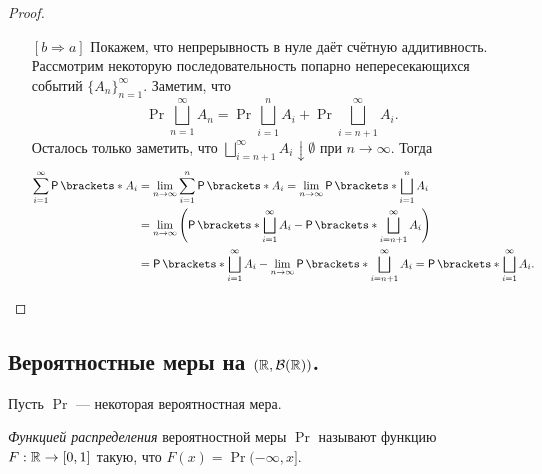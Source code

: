 \begin{proof}
\begin{itemize}
		\item[{\([b \Rightarrow a]\)}] Покажем, что непрерывность в нуле даёт счётную аддитивность. Рассмотрим некоторую последовательность попарно непересекающихся событий \(\{A_n\}_{n = 1}^{\infty}\). Заметим, что
		\[
		\Pr{\bigsqcup\limits_{n=1}^{\infty}A_n} =
		\Pr{\bigsqcup\limits_{i=1}^{n}A_i} +
		\Pr{\bigsqcup\limits_{i=n + 1}^{\infty} A_i}.
		\]
		Осталось только заметить, что \(\bigsqcup\limits_{i= n + 1}^{\infty} A_i \downarrow \emptyset\) при \(n \to \infty\). Тогда
		\begin{align}
			\sum\limits_{i = 1}^{\infty}\Pr{A_i} &=
			\lim\limits_{n\to\infty} \sum\limits_{i = 1}^{n}\Pr{A_i} =
			\lim\limits_{n\to\infty} \Pr{\bigsqcup\limits_{i = 1}^{n}A_i} \\
			&= \lim\limits_{n\to\infty} \left(
			\Pr{\bigsqcup\limits_{i = 1}^{\infty}A_i} -
			\Pr{\bigsqcup\limits_{i = n+1}^{\infty}A_i}
			\right) \\
			&= \Pr{\bigsqcup\limits_{i = 1}^{\infty}A_i} -
			\lim\limits_{n\to\infty} \Pr{\bigsqcup\limits_{i = n+1}^{\infty}A_i} =
			\Pr{\bigsqcup\limits_{i = 1}^{\infty}A_i}.\qedhere
		\end{align}
	\end{itemize}
\end{proof}


\subsection{Вероятностные меры на $\left( \mathbb{R}, \mathcal{B}(\mathbb{R}) \right)$.}
Пусть $\Pr$ --- некоторая вероятностная мера.

\begin{definition}
	\emph{Функцией распределения} вероятностной меры $\Pr$ называют функцию $F: \mathbb{R} \to [0, 1]$ такую, что
	$F(x) = \Pr{(-\infty, x]}$.
\end{definition}

